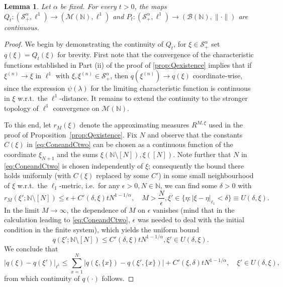 \documentclass[11pt,a4paper]{scrartcl}
\numberwithin{equation}{section}
\theoremstyle{plain}
\newtheorem{lemma}[theorem]{Lemma}
\theoremstyle{definition}
\theoremstyle{remark}
\newcommand{\bN}{\ensuremath{\mathbb{N}}}
\begin{document}
\begin{lemma}\label{lemma:P-continuous}
Let $\alpha$ be fixed. For every $t>0$, the maps $Q_t: (\mathcal{S}^\alpha_+, \ell^1)\to (\mathcal{M}(\bN), \ell^1)$ and $P_t: (\mathcal{S}^\alpha_+, \ell^1)\to (\mathcal{B}(\bN), \|\cdot\|)$ are continuous.	
\end{lemma}
\begin{proof}
We begin by demonstrating the continuity of $Q_t$, for $\xi \in \mathcal{S}^{\alpha}_+$ set $q(\xi)=Q_t(\xi)$ for brevity. First note that the convergence of the characteristic functions established in Part (ii) of the proof of \ref{prop:Qexistence} implies that if $\xi^{(n)}\to \xi$ in $\ell^1$ with $\xi,\xi^{(n)}\in \mathcal{S}^{\alpha}_+$, then $q(\xi^{(n)})\to q(\xi)$ coordinate-wise, since the expression $\psi(\lambda)$ for the limiting characteristic function is continuous in $\xi$ w.r.t.\ the $\ell^1$-distance. It remains to extend the continuity to the stronger topology of $\ell^1$ convergence on $\mathcal{M}(\bN).$ 

To this end, let $r_M(\xi)$ denote the approximating measures $R^{M,\xi}$ used in the proof of Proposition~\ref{prop:Qexistence}. Fix $N$ and observe that the constants $C(\xi)$ in \eqref{eq:ConeandCtwo} can be chosen as a continuous function of the coordinate $\xi_{N+1}$ and the sums $\xi(\bN\setminus[N]),\xi([N])$. Note further that $N$ in \eqref{eq:ConeandCtwo} is chosen independently of $\xi$; consequently the bound there holds uniformly (with $C(\xi)$ replaced by some $C'$) in some small neighbourhood of $\xi$ w.r.t.\ the $\ell_1$-metric, i.e.\ for any $\epsilon>0, N\in\bN$, we can find some $\delta>0$ with
\[
r_M(\xi'; \bN\setminus[N])\leq \epsilon+ C'(\delta,\xi)tN^{1-1/\alpha},\quad M>\frac{N}{\epsilon}, \xi'\in \{\eta:|\xi-\eta|_{\ell_1}<\delta\}\equiv U(\delta,\xi).
\]
In the limit $M\to\infty$, the dependence of $M$ on $\epsilon$ vanishes (mind that in the calculation leading to \eqref{eq:ConeandCtwo}, $\epsilon$ was needed to deal with the initial condition in the finite system), which yields the uniform bound
\begin{equation}\label{eq:uniformQtail}
q(\xi';\bN\setminus[N])\leq C'(\delta,\xi)tN^{1-1/\alpha}, \xi'\in U(\delta,\xi).
\end{equation}
We conclude that
\begin{equation}\label{eq:q_unif}
|q(\xi)-q(\xi')|_{\ell^1}\leq \sum_{x=1}^N |q(\xi,\{x\})-q(\xi',\{x\})| + C'(\xi,\delta)tN^{1-1/\alpha}, \quad \xi'\in U(\delta,\xi),
\end{equation}
from which continuity of $q(\cdot)$ follows. 



\end{proof}
\end{document}

